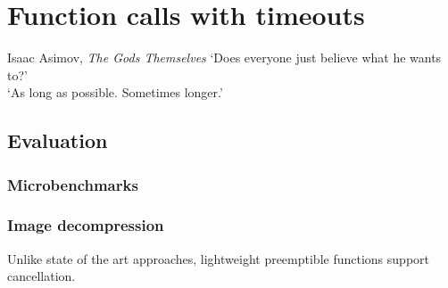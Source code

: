 \chapter{Function calls with timeouts}
\label{chap:libinger}

\ifdefined\chapquotes
\begin{chapquote}{Isaac Asimov, \textit{The Gods Themselves}}
`Does everyone just believe what he wants to?' \\
`As long as possible.  Sometimes longer.'
\end{chapquote}
\fi

\begin{swallowsections}

\end{swallowsections}









\section{Evaluation}




\subsection{Microbenchmarks}




\subsection{Image decompression}

Unlike state of the art approaches, lightweight preemptible functions support
cancellation.

